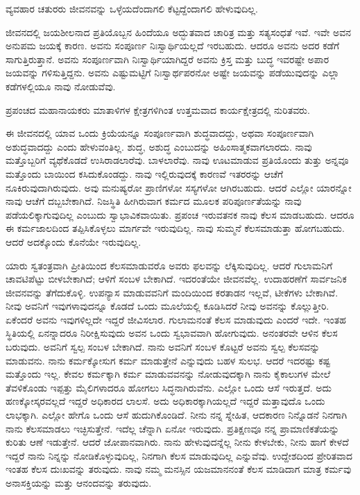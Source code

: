 ವ್ಯವಹಾರ ಚತುರರು ಜೀವನವನ್ನು ಒಳ್ಳೆಯದೆಂದಾಗಲಿ ಕೆಟ್ಟದ್ದೆಂದಾಗಲಿ ಹೇಳುವುದಿಲ್ಲ.

ಜೀವನದಲ್ಲಿ ಜಯಶೀಲನಾದ ಪ್ರತಿಯೊಬ್ಬನ ಹಿಂದೆಯೂ ಅದ್ಭುತವಾದ ಚಾರಿತ್ರ ಮತ್ತು ಸತ್ಯಸಂಧತೆ ಇವೆ. ಇವೇ ಅವನ ಅನುಪಮ ಜಯಕ್ಕೆ ಕಾರಣ. ಅವನು ಸಂಪೂರ್ಣ ನಿಃಸ್ವಾರ್ಥಿಯಲ್ಲದೆ ಇರಬಹುದು. ಆದರೂ ಅವನು ಅದರ ಕಡೆಗೆ ಸಾಗುತ್ತಿರುತ್ತಾನೆ. ಅವನು ಸಂಪೂರ್ಣವಾಗಿ ನಿಃಸ್ವಾರ್ಥಿಯಾಗಿದ್ದರೆ ಅವನು ಕ್ರಿಸ್ತ ಮತ್ತು ಬುದ್ಧ ಇವರಷ್ಟೇ ಅಪಾರ ಜಯವನ್ನು ಗಳಿಸುತ್ತಿದ್ದನು. ಅವನು ಎಷ್ಟುಮಟ್ಟಿಗೆ ನಿಃಸ್ವಾರ್ಥಪರನೋ ಅಷ್ಟೇ ಜಯವನ್ನು ಪಡೆಯುವುದನ್ನು ಎಲ್ಲಾ ಕಡೆಗಳಲ್ಲಿಯೂ ನಾವು ನೋಡುವೆವು.

ಪ್ರಪಂಚದ ಮಹಾನಾಯಕರು ಮಾತಾಳಿಗಳ ಕ್ಷೇತ್ರಗಳಿಗಿಂತ ಉತ್ತಮವಾದ ಕಾರ್ಯಕ್ಷೇತ್ರದಲ್ಲಿ ನುರಿತವರು.

ಈ ಜೀವನದಲ್ಲಿ ಯಾವ ಒಂದು ಕ್ರಿಯೆಯನ್ನೂ ಸಂಪೂರ್ಣವಾಗಿ ಶುದ್ಧವಾದದ್ದು, ಅಥವಾ ಸಂಪೂರ್ಣವಾಗಿ ಅಶುದ್ಧವಾದದ್ದು ಎಂದು ಹೇಳುವಂತಿಲ್ಲ. ಶುದ್ಧ, ಅಶುದ್ಧ ಎಂಬುದನ್ನು ಅಹಿಂಸಾತ್ಮಕವಾಗಲಾರದು. ನಾವು ಮತ್ತೊಬ್ಬರಿಗೆ ವ್ಯಥೆಕೊಡದೆ ಉಸಿರಾಡಲಾರೆವು. ಬಾಳಲಾರೆವು. ನಾವು ಊಟಮಾಡುವ ಪ್ರತಿಯೊಂದು ತುತ್ತು ಅನ್ನವೂ ಮತ್ತೊಂದು ಬಾಯಿಂದ ಕಸಿದುಕೊಂಡದ್ದು. ನಾವು ಇಲ್ಲಿರುವುದಕ್ಕೆ ಕಾರಣವೆ ಇತರರನ್ನು ಆಚೆಗೆ ನೂಕಿರುವುದಾಗಿರುವುದು. ಅವು ಮನುಷ್ಯರೋ ಪ್ರಾಣಿಗಳೋ ಸಸ್ಯಗಳೋ ಆಗಿರಬಹುದು. ಆದರೆ ಎಲ್ಲೋ ಯಾರನ್ನೋ ನಾವು ಆಚೆಗೆ ದಬ್ಬಬೇಕಾಗಿದೆ. ನಿಜಸ್ಥಿತಿ ಹೀಗಿರುವಾಗ ಕರ್ಮದ ಮೂಲಕ ಪರಿಪೂರ್ಣತೆಯನ್ನು ನಾವು ಪಡೆಯಲಿಕ್ಕಾಗುವುದಿಲ್ಲ ಎಂಬುದು ಸ್ವಾಭಾವಿಕವಾಯಿತು. ಪ್ರಪಂಚ ಇರುವತನಕ ನಾವು ಕೆಲಸ ಮಾಡಬಹುದು. ಆದರೂ ಈ ಕರ್ಮಜಾಲದಿಂದ ತಪ್ಪಿಸಿಕೊಳ್ಳಲು ಮಾರ್ಗವೇ ಇರುವುದಿಲ್ಲ. ನಾವು ಸುಮ್ಮನೆ ಕೆಲಸಮಾಡುತ್ತಾ ಹೋಗಬಹುದು. ಆದರೆ ಅದಕ್ಕೊಂದು ಕೊನೆಯೇ ಇರುವುದಿಲ್ಲ.

ಯಾರು ಸ್ವತಂತ್ರವಾಗಿ ಪ್ರೀತಿಯಿಂದ ಕೆಲಸಮಾಡುವರೊ ಅವರು ಫಲವನ್ನು ಲೆಕ್ಕಿಸುವುದಿಲ್ಲ. ಆದರೆ ಗುಲಾಮನಿಗೆ ಚಾವಟಿಪೆಟ್ಟು ಬೀಳಬೇಕಾಗಿದೆ; ಆಳಿಗೆ ಸಂಬಳ ಬೇಕಾಗಿದೆ. ಇದರಂತೆಯೇ ಜೀವನವೆಲ್ಲ. ಉದಾಹರಣೆಗೆ ಸಾರ್ವಜನಿಕ ಜೀವನವನ್ನು ತೆಗೆದುಕೊಳ್ಳಿ. ಉಪನ್ಯಾಸ ಮಾಡುವವನಿಗೆ ಮಂದಿಯಿಂದ ಕರತಾಡನ ಇಲ್ಲವೆ, ಟೀಕೆಗಳು ಬೇಕಾಗಿವೆ. ನೀವು ಅವನಿಗೆ ಇವುಗಳಾವುದನ್ನೂ ಕೊಡದೆ ಒಂದು ಮೂಲೆಯಲ್ಲಿ ಕೂಡಿಸಿದರೆ ನೀವು ಅವನನ್ನು ಕೊಲ್ಲುತ್ತೀರಿ. ಏಕೆಂದರೆ ಅವನು ಇವುಗಳಿಲ್ಲದೇ ಇದ್ದರೆ ಜೀವಿಸಲಾರ. ಗುಲಾಮನಂತೆ ಕೆಲಸ ಮಾಡುವುದು ಎಂದರೆ ಇದೇ. ಇಂತಹ ಸ್ಥಿತಿಯಲ್ಲಿ ಏನನ್ನಾದರೂ ನಿರೀಕ್ಷಿಸುವುದು ಅವನ ಒಂದು ಸ್ವಭಾವವಾಗಿ ಹೋಗುವುದು. ಅನಂತರವೇ ಆಳಿನ ಕೆಲಸ ಬರುವುದು. ಅವನಿಗೆ ಸ್ವಲ್ಪ ಸಂಬಳ ಬೇಕಾಗಿದೆ. ನಾನು ಅವನಿಗೆ ಸಂಬಳ ಕೊಟ್ಟರೆ ಅವನು ಸ್ವಲ್ಪ ಕೆಲಸವನ್ನು ಮಾಡುವನು. ನಾನು ಕರ್ಮಕ್ಕೋಸುಗ ಕರ್ಮ ಮಾಡುತ್ತೇನೆ ಎನ್ನುವುದು ಬಹಳ ಸುಲಭ. ಆದರೆ ಇದರಷ್ಟು ಕಷ್ಟ ಮತ್ತೊಂದು ಇಲ್ಲ. ಕೇವಲ ಕರ್ಮಕ್ಕಾಗಿ ಕರ್ಮ ಮಾಡುವವನನ್ನು ನೋಡುವುದಕ್ಕಾಗಿ ನಾನು ಕೈಕಾಲುಗಳ ಮೇಲೆ ತೆವಳಿಕೊಂಡು ಇಪ್ಪತ್ತು ಮೈಲಿಗಳಾದರೂ ಹೋಗಲು ಸಿದ್ಧನಾಗಿರುವೆನು. ಎಲ್ಲೋ ಒಂದು ಆಸೆ ಇರುತ್ತದೆ. ಅದು ಹಣಕ್ಕೋಸ್ಕರವಲ್ಲದೆ ಇದ್ದರೆ ಅಧಿಕಾರದ ಲಾಲಸೆ. ಅದು ಅಧಿಕಾರಕ್ಕಾಗಿಯಲ್ಲದೆ ಇದ್ದರೆ ಮತ್ತಾವುದೊ ಒಂದು ಲಾಭಕ್ಕಾಗಿ. ಎಲ್ಲೋ ಹೇಗೊ ಒಂದು ಆಸೆ ಹುದುಗಿಕೊಂಡಿದೆ. ನೀನು ನನ್ನ ಸ್ನೇಹಿತ, ಆದಕಾರಣ ನಿನ್ನೊಡನೆ ನಿನಗಾಗಿ ನಾನು ಕೆಲಸಮಾಡಲು ಇಚ್ಛಿಸುತ್ತೇನೆ. ಇದೆಲ್ಲ ಚೆನ್ನಾಗಿ ಏನೋ ಇರುವುದು. ಪ್ರತಿಕ್ಷಣವೂ ನನ್ನ ಪ್ರಾಮಾಣಿಕತೆಯನ್ನು ಕುರಿತು ಆಣೆ ಇಡುತ್ತೇನೆ. ಆದರೆ ಜೋಪಾನವಾಗಿರು. ನಾನು ಹೇಳುವುದನ್ನೆಲ್ಲ ನೀನು ಕೇಳಬೇಕು, ನೀನು ಹಾಗೆ ಕೇಳದೆ ಇದ್ದರೆ ನಾನು ನಿನ್ನನ್ನು ನೋಡಿಕೊಳ್ಳುವುದಿಲ್ಲ, ನಿನಗಾಗಿ ಕೆಲಸ ಮಾಡುವುದಿಲ್ಲ ಎನ್ನುವೆವು. ಉದ್ದೇಶದಿಂದ ಪ್ರೇರಿತವಾದ ಇಂತಹ ಕೆಲಸ ದುಃಖವನ್ನು ತರುವುದು. ನಾವು ನಮ್ಮ ಮನಸ್ಸಿನ ಯಜಮಾನನಂತೆ ಕೆಲಸ ಮಾಡಿದಾಗ ಮಾತ್ರ ಕರ್ಮವು ಅನಾಸಕ್ತಿಯನ್ನು ಮತ್ತು ಆನಂದವನ್ನು ತರುವುದು.

